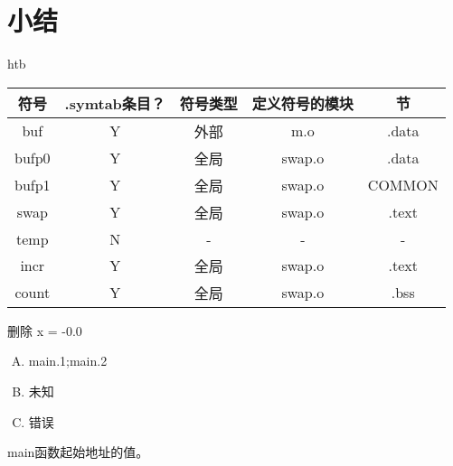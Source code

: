 
\section{小结}
{
    \begin{practicec}
        \begin{table}{htb}
            \centering

            \begin{tabular}{|c|c|c|c|c|}
                \hline
                符号 & .symtab条目？ & 符号类型 & 定义符号的模块 & 节 \\
                \hline
                buf & Y & 外部 & m.o & .data \\
                \hline
                bufp0 & Y & 全局 & swap.o & .data \\
                \hline
                bufp1 & Y & 全局 & swap.o & COMMON \\
                \hline
                swap & Y & 全局 & swap.o & .text \\
                \hline
                temp & N & - & - & - \\
                \hline
                incr & Y & 全局 & swap.o  & .text \\
                \hline
                count & Y & 全局 & swap.o & .bss \\
                \hline
            \end{tabular}
        \end{table}
    \end{practicec}

    \begin{practicec}
        删除 x = -0.0
    \end{practicec}

    \begin{practicec}
        \begin{enumerate}[A.]
            \item main.1;main.2
            \item 未知
            \item 错误
        \end{enumerate}
    \end{practicec}

    \begin{practicec}
        main函数起始地址的值。
    \end{practicec}

}
